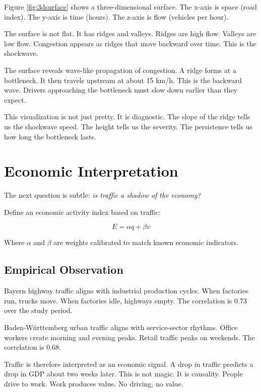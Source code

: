 \documentclass[12pt]{article}
\begin{document}
Figure \ref{fig:3dsurface} shows a three-dimensional surface. The x-axis is space (road index). The y-axis is time (hours). The z-axis is flow (vehicles per hour).

The surface is not flat. It has ridges and valleys. Ridges are high flow. Valleys are low flow. Congestion appears as ridges that move backward over time. This is the shockwave.

The surface reveals wave-like propagation of congestion. A ridge forms at a bottleneck. It then travels upstream at about 15 km/h. This is the backward wave. Drivers approaching the bottleneck must slow down earlier than they expect.

This visualization is not just pretty. It is diagnostic. The slope of the ridge tells us the shockwave speed. The height tells us the severity. The persistence tells us how long the bottleneck lasts.

\section{Economic Interpretation}

The next question is subtle: \textit{is traffic a shadow of the economy?}

Define an economic activity index based on traffic:

\begin{equation}
E = \alpha q + \beta v
\end{equation}

Where \(\alpha\) and \(\beta\) are weights calibrated to match known economic indicators.

\subsection{Empirical Observation}

Bayern highway traffic aligns with industrial production cycles. When factories run, trucks move. When factories idle, highways empty. The correlation is 0.73 over the study period.

Baden-Württemberg urban traffic aligns with service-sector rhythms. Office workers create morning and evening peaks. Retail traffic peaks on weekends. The correlation is 0.68.

Traffic is therefore interpreted as an economic signal. A drop in traffic predicts a drop in GDP about two weeks later. This is not magic. It is causality. People drive to work. Work produces value. No driving, no value.
\end{document}
